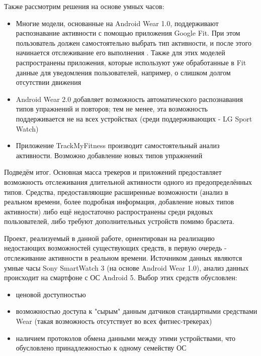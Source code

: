 Также рассмотрим решения на основе умных часов:
\begin{itemize}
\item Многие модели, основанные на Android Wear 1.0, поддерживают распознавание активности с помощью приложения Google Fit. При этом пользователь должен самостоятельно выбрать тип активности, и после этого начинается отслеживание его выполнения . Также для этих моделей распространены приложения, которые используют уже обработанные в Fit данные для уведомления пользователей, например, о слишком долгом отсутствии движения
\item Android Wear 2.0 добавляет возможность автоматического распознавания типов упражнений и повторов; тем не менее, эта возможность поддерживается не на всех устройствах (среди поддерживающих - LG Sport Watch)
\item Приложение TrackMyFitness производит самостоятельный анализ активности. Возможно добавление новых типов упражнений 
\end{itemize}

Подведём итог. Основная масса трекеров и приложений предоставляет возможность отслеживания длительной активности одного из предопределённых типов. Средства, предоставляющие расширенные возможности (анализ в реальном времени, более подробная информация, добавление новых типов активности) либо ещё недостаточно распространены среди рядовых пользователей, либо требуют дополнительных устройств помимо браслета. 


Проект, реализуемый в данной работе, ориентирован на реализацию недостающих возможностей существующих средств, в первую очередь - отслеживание активности в реальном времени. Источником данных являются умные часы Sony SmartWatch 3 (на основе Android Wear 1.0), анализ данных происходит на смартфоне с ОС Android 5. Выбор этих средств обусловлен:
\begin{itemize}
\item ценовой доступностью
\item возможностью доступа к "сырым" данным датчиков стандартными средствами Wear (такая возможность отсутствует во всех фитнес-трекерах)
\item наличием протоколов обмена данными между этими устройствами, что обусловлено принадлежностью к одному семейству ОС
\end{itemize}

